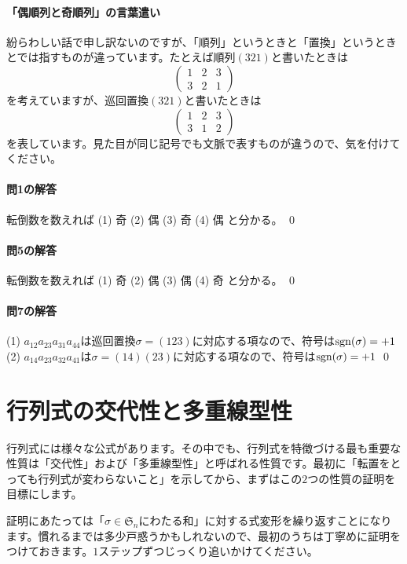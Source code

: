 \paragraph{「偶順列と奇順列」の言葉遣い} 紛らわしい話で申し訳ないのですが、「順列」というときと「置換」というときとでは指すものが違っています。たとえば順列$(321)$と書いたときは
\[
\begin{pmatrix}
1 & 2 & 3 \\
3 & 2 & 1
\end{pmatrix}
\]
を考えていますが、巡回置換$(321)$と書いたときは
\[
\begin{pmatrix}
1 & 2 & 3 \\
3 & 1 & 2
\end{pmatrix}
\]
を表しています。見た目が同じ記号でも文脈で表すものが違うので、気を付けてください。

\paragraph{問1の解答} 転倒数を数えれば (1) 奇 (2) 偶 (3) 奇 (4) 偶 と分かる。 \qed

\paragraph{問5の解答} 転倒数を数えれば (1) 奇 (2) 偶 (3) 偶 (4) 奇 と分かる。 \qed

\paragraph{問7の解答} (1) $a_{12}a_{23}a_{31}a_{44}$は巡回置換$\sigma = (123)$に対応する項なので、符号は$\operatorname{sgn}(\sigma) = +1$
(2) $a_{14}a_{23}a_{32}a_{41}$は$\sigma = (14)(23)$に対応する項なので、符号は$\operatorname{sgn}(\sigma) = +1$ \qed

\section{行列式の交代性と多重線型性}

行列式には様々な公式があります。その中でも、行列式を特徴づける最も重要な性質は「交代性」および「多重線型性」と呼ばれる性質です。最初に「転置をとっても行列式が変わらないこと」を示してから、まずはこの$2$つの性質の証明を目標にします。

証明にあたっては「$\sigma \in \mathfrak{S}_n$にわたる和」に対する式変形を繰り返すことになります。慣れるまでは多少戸惑うかもしれないので、最初のうちは丁寧めに証明をつけておきます。$1$ステップずつじっくり追いかけてください。

